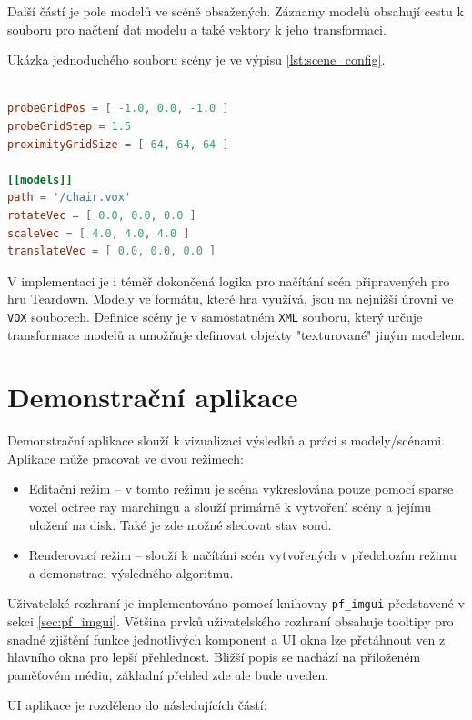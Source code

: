Další částí je pole modelů ve scéně obsažených. Záznamy modelů obsahují cestu k souboru pro načtení dat modelu a také vektory k jeho transformaci.

Ukázka jednoduchého souboru scény je ve výpisu \ref{lst:scene_config}.\\\\

\begin{lstlisting}[label={lst:scene_config}, language=toml, caption={Definice jednoduché scény}]
probeGridPos = [ -1.0, 0.0, -1.0 ]
probeGridStep = 1.5
proximityGridSize = [ 64, 64, 64 ]

[[models]]
path = '/chair.vox'
rotateVec = [ 0.0, 0.0, 0.0 ]
scaleVec = [ 4.0, 4.0, 4.0 ]
translateVec = [ 0.0, 0.0, 0.0 ]
\end{lstlisting}

V implementaci je i téměř dokončená logika pro načítání scén připravených pro hru Teardown. Modely ve formátu, které hra využívá, jsou na nejnižší úrovni ve \texttt{VOX} souborech. Definice scény je v samostatném \texttt{XML} souboru, který určuje transformace modelů a umožňuje definovat objekty "texturované" jiným modelem.

\section{Demonstrační aplikace}\label{sec:demo_app}
Demonstrační aplikace slouží k vizualizaci výsledků a práci s modely/scénami. Aplikace může pracovat ve dvou režimech:
\begin{itemize}
    \item Editační režim -- v tomto režimu je scéna vykreslována pouze pomocí sparse voxel octree ray marchingu a slouží primárně k vytvoření scény a jejímu uložení na disk. Také je zde možné sledovat stav sond.
    \item Renderovací režim -- slouží k načítání scén vytvořených v předchozím režimu a demonstraci výsledného algoritmu.
\end{itemize}

Uživatelské rozhraní je implementováno pomocí knihovny \texttt{pf\_imgui} představené v sekci \ref{sec:pf_imgui}. Většina prvků uživatelského rozhraní obsahuje tooltipy pro snadné zjištění funkce jednotlivých komponent a UI okna lze přetáhnout ven z hlavního okna pro lepší přehlednost. Bližší popis se nachází na přiloženém paměťovém médiu, základní přehled zde ale bude uveden.

UI aplikace je rozděleno do následujících částí:

